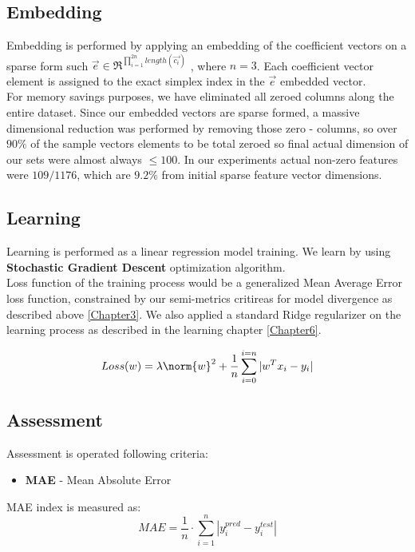 \subsection{Embedding}
Embedding is performed by applying an embedding of the coefficient vectors on a sparse form such $\overrightarrow{e} \in \Re^{\prod_{i=1}^{2n}{length(\overrightarrow{c_i})}}$ , where $n = 3$.
Each coefficient vector element is assigned to the exact simplex index in the $\overrightarrow{e}$ embedded vector.
\\
For memory savings purposes, we have eliminated all zeroed columns along the entire dataset.
Since our embedded vectors are sparse formed, a massive dimensional reduction was performed by removing those zero - columns, so over $90 \% $ of the sample vectors elements to be total zeroed so final actual dimension of our sets were almost always $ \le 100$. In our experiments actual non-zero features were $109/1176$, which are $9.2 \%$ from initial sparse feature vector dimensions.

\subsection{Learning}
Learning is performed as a linear regression model training.
We learn by using \textbf{Stochastic Gradient Descent} \cite{SGD} optimization algorithm. \\
Loss function of the training process would be a generalized Mean Average Error \cite{MAE} loss function, constrained by our semi-metrics critireas for model divergence as described above \ref{Chapter3}.
We also applied a standard Ridge \cite{Ridge} regularizer on the learning process as described in the learning chapter \ref{Chapter6}.
\cite{retargeting} \cite{einstein}

\begin{equation}
	Loss(w)=\lambda\norm{w}^2 + \frac{1}{n}\sum_{i=0}^{i=n} |w^T x_i - y_i|
\end{equation}

\subsection{Assessment}
Assessment is operated following criteria:
\begin{itemize}
\item \textbf{MAE} - Mean Absolute Error
\end{itemize}

MAE index is measured as:
\begin{equation}
MAE = \frac{1}{n} \cdot \sum_{i = 1}^{n}{|y^{pred}_i - y^{test}_i|}
\end{equation}


